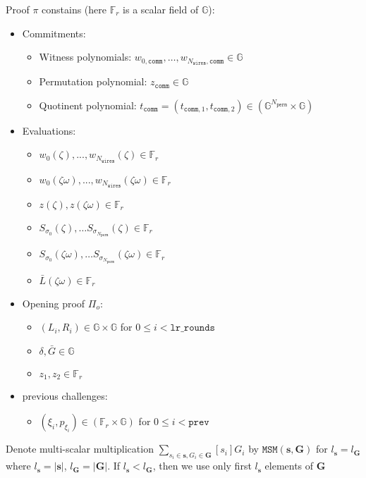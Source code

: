 Proof $\pi$ constains (here $\mathbb{F}_r$ is a scalar field of $\mathbb{G}$):
\begin{itemize}\label{proof-state}
	\item Commitments:
	\begin{itemize}
		\item Witness polynomials: $w_{0, \texttt{comm}}, \dots, w_{N_{\texttt{wires}}, \texttt{comm}} \in \mathbb{G}$
		\item Permutation polynomial: $z_{\texttt{comm}} \in \mathbb{G}$
		\item Quotinent polynomial: $t_{\texttt{comm}} = (t_{\texttt{comm}, 1}, t_{\texttt{comm}, 2}) \in (\mathbb{G}^{N_{\texttt{perm}}} \times \mathbb{G})$
	\end{itemize}
	\item Evaluations:
	\begin{itemize}
		\item $w_0(\zeta), ..., w_{N_{\texttt{wires}}}(\zeta) \in \mathbb{F}_r$
		\item $w_0(\zeta\omega), ..., w_{N_{\texttt{wires}}}(\zeta\omega) \in \mathbb{F}_r$
		\item $z(\zeta), z(\zeta\omega) \in \mathbb{F}_r$
		\item $S_{\sigma_0}(\zeta), \dots S_{\sigma_{N_{\texttt{perm}}}}(\zeta) \in \mathbb{F}_r$
		\item $S_{\sigma_0}(\zeta\omega), \dots S_{\sigma_{N_{\texttt{perm}}}}(\zeta\omega) \in \mathbb{F}_r$
		\item $\bar{L}(\zeta\omega) \in \mathbb{F}_r$
	\end{itemize}
	\item Opening proof $\Pi_o$:
	\begin{itemize}
		\item $(L_i, R_i) \in \mathbb{G} \times \mathbb{G}$ for $0 \leq i < \texttt{lr\_rounds}$ %
		\item $\delta, \bar{G} \in \mathbb{G}$
		\item $z_1, z_2 \in \mathbb{F}_{r}$
	\end{itemize}
	\item previous challenges:
	\begin{itemize}
		\item $(\xi_i, p_{\xi_i}) \in (\mathbb{F}_r \times \mathbb{G})$ for $0 \leq i < \texttt{prev}$
	\end{itemize}
\end{itemize}


Denote multi-scalar multiplication $\sum\limits_{s_i \in \textbf{s}, G_i \in \textbf{G}}[s_i]G_i$ by $\texttt{MSM}(\textbf{s}, \textbf{G})$ for $l_{\textbf{s}} = l_{\textbf{G}}$ where $l_{\textbf{s}} = |\textbf{s}|$, $l_{\textbf{G}} = |\textbf{G}|$. 
If $l_{\textbf{s}} < l_{\textbf{G}}$, then we use only first $l_{\textbf{s}}$ elements of $\textbf{G}$

